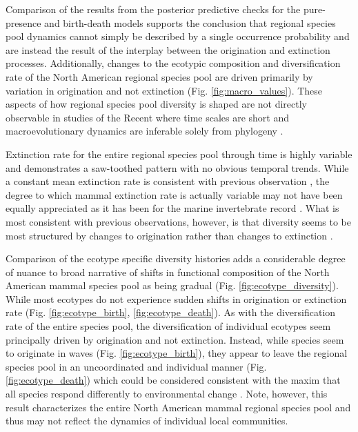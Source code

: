 Comparison of the results from the posterior predictive checks for the pure-presence and birth-death models supports the conclusion that regional species pool dynamics cannot simply be described by a single occurrence probability and are instead the result of the interplay between the origination and extinction processes. Additionally, changes to the ecotypic composition and diversification rate of the North American regional species pool are driven primarily by variation in origination and not extinction (Fig. \ref{fig:macro_values}). These aspects of how regional species pool diversity is shaped are not directly observable in studies of the Recent where time scales are short and macroevolutionary dynamics are inferable solely from phylogeny \citep{Fritz2013a,Price2016b}.

Extinction rate for the entire regional species pool through time is highly variable and demonstrates a saw-toothed pattern with no obvious temporal trends. While a constant mean extinction rate is consistent with previous observation \citep{Alroy1996a,Alroy2000g}, the degree to which mammal extinction rate is actually variable may not have been equally appreciated as it has been for the marine invertebrate record \citep{Foote2000,Foote2000a,Foote2006,Foote2010}. What is most consistent with previous observations, however, is that diversity seems to be most structured by changes to origination rather than changes to extinction \citep{Alroy1996a,Alroy2000g}.

Comparison of the ecotype specific diversity histories adds a considerable degree of nuance to broad narrative of shifts in functional composition of the North American mammal species pool as being gradual (Fig. \ref{fig:ecotype_diversity}). While most ecotypes do not experience sudden shifts in origination or extinction rate (Fig. \ref{fig:ecotype_birth}, \ref{fig:ecotype_death}). As with the diversification rate of the entire species pool, the diversification of individual ecotypes seem principally driven by origination and not extinction. Instead, while species seem to originate in waves (Fig. \ref{fig:ecotype_birth}), they appear to leave the regional species pool in an uncoordinated and individual manner (Fig. \ref{fig:ecotype_death}) which could be considered consistent with the maxim that all species respond differently to environmental change \citep{Blois2009}. Note, however, this result characterizes the entire North American mammal regional species pool and thus may not reflect the dynamics of individual local communities.


